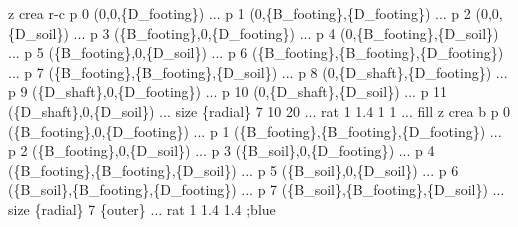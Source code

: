 \documentclass[a4paper, nobind]{templates/ociamthesis}
\newenvironment{Shaded}{\begin{snugshade}}{\end{snugshade}}
\newcommand{\SpecialCharTok}[1]{\textcolor[rgb]{0.00,0.00,0.00}{#1}}
\newcommand{\StringTok}[1]{\textcolor[rgb]{0.31,0.60,0.02}{#1}}
\renewenvironment{Shaded}
{
  \vspace{10pt}%
  \begin{snugshade}%
}{%
  \end{snugshade}%
  \vspace{8pt}%
}
\begin{document}
\begin{Shaded}
\begin{Highlighting}[]
\StringTok{z crea r{-}c p 0 (0,0,}\SpecialCharTok{\{D\_footing\}}\StringTok{) ...}
\StringTok{           p 1 (0,}\SpecialCharTok{\{B\_footing\}}\StringTok{,}\SpecialCharTok{\{D\_footing\}}\StringTok{) ...}
\StringTok{           p 2 (0,0,}\SpecialCharTok{\{D\_soil\}}\StringTok{) ...}
\StringTok{           p 3 (}\SpecialCharTok{\{B\_footing\}}\StringTok{,0,}\SpecialCharTok{\{D\_footing\}}\StringTok{) ...}
\StringTok{           p 4 (0,}\SpecialCharTok{\{B\_footing\}}\StringTok{,}\SpecialCharTok{\{D\_soil\}}\StringTok{) ...}
\StringTok{           p 5 (}\SpecialCharTok{\{B\_footing\}}\StringTok{,0,}\SpecialCharTok{\{D\_soil\}}\StringTok{) ...}
\StringTok{           p 6 (}\SpecialCharTok{\{B\_footing\}}\StringTok{,}\SpecialCharTok{\{B\_footing\}}\StringTok{,}\SpecialCharTok{\{D\_footing\}}\StringTok{) ...}
\StringTok{           p 7 (}\SpecialCharTok{\{B\_footing\}}\StringTok{,}\SpecialCharTok{\{B\_footing\}}\StringTok{,}\SpecialCharTok{\{D\_soil\}}\StringTok{) ...}
\StringTok{           p 8 (0,}\SpecialCharTok{\{D\_shaft\}}\StringTok{,}\SpecialCharTok{\{D\_footing\}}\StringTok{) ...}
\StringTok{           p 9 (}\SpecialCharTok{\{D\_shaft\}}\StringTok{,0,}\SpecialCharTok{\{D\_footing\}}\StringTok{) ...}
\StringTok{           p 10 (0,}\SpecialCharTok{\{D\_shaft\}}\StringTok{,}\SpecialCharTok{\{D\_soil\}}\StringTok{) ...}
\StringTok{           p 11 (}\SpecialCharTok{\{D\_shaft\}}\StringTok{,0,}\SpecialCharTok{\{D\_soil\}}\StringTok{) ...}
\StringTok{           size }\SpecialCharTok{\{radial\}}\StringTok{ 7 10 20 ...}
\StringTok{           rat 1 1.4 1 1 ...}
\StringTok{           fill}
\StringTok{           }
\StringTok{z crea b p 0 (}\SpecialCharTok{\{B\_footing\}}\StringTok{,0,}\SpecialCharTok{\{D\_footing\}}\StringTok{) ...}
\StringTok{         p 1 (}\SpecialCharTok{\{B\_footing\}}\StringTok{,}\SpecialCharTok{\{B\_footing\}}\StringTok{,}\SpecialCharTok{\{D\_footing\}}\StringTok{) ...}
\StringTok{         p 2 (}\SpecialCharTok{\{B\_footing\}}\StringTok{,0,}\SpecialCharTok{\{D\_soil\}}\StringTok{) ...}
\StringTok{         p 3 (}\SpecialCharTok{\{B\_soil\}}\StringTok{,0,}\SpecialCharTok{\{D\_footing\}}\StringTok{) ...}
\StringTok{         p 4 (}\SpecialCharTok{\{B\_footing\}}\StringTok{,}\SpecialCharTok{\{B\_footing\}}\StringTok{,}\SpecialCharTok{\{D\_soil\}}\StringTok{) ...}
\StringTok{         p 5 (}\SpecialCharTok{\{B\_soil\}}\StringTok{,0,}\SpecialCharTok{\{D\_soil\}}\StringTok{) ...}
\StringTok{         p 6 (}\SpecialCharTok{\{B\_soil\}}\StringTok{,}\SpecialCharTok{\{B\_footing\}}\StringTok{,}\SpecialCharTok{\{D\_footing\}}\StringTok{) ...}
\StringTok{         p 7 (}\SpecialCharTok{\{B\_soil\}}\StringTok{,}\SpecialCharTok{\{B\_footing\}}\StringTok{,}\SpecialCharTok{\{D\_soil\}}\StringTok{) ...}
\StringTok{         size }\SpecialCharTok{\{radial\}}\StringTok{ 7 }\SpecialCharTok{\{outer\}}\StringTok{ ...}
\StringTok{         rat 1 1.4 1.4 ;blue}


\end{Highlighting}
\end{Shaded}
\end{document}
